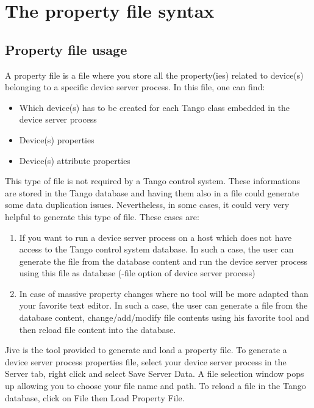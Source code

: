 
\chapter{The property file syntax}


\section{Property file usage}

A property file is a file where you store all the property(ies) related
to device(s) belonging to a specific device server process. In this
file, one can find:
\begin{itemize}
\item Which device(s) has to be created for each Tango class embedded in
the device server process
\item Device(s) properties
\item Device(s) attribute properties
\end{itemize}
This type of file is not required by a Tango control system. These
informations are stored in the Tango database and having them also
in a file could generate some data duplication issues. Nevertheless,
in some cases, it could very very helpful to generate this type of
file. These cases are:
\begin{enumerate}
\item If you want to run a device server process on a host which does not
have access to the Tango control system database. In such a case,
the user can generate the file from the database content and run the
device server process using this file as database (-file option of
device server process)
\item In case of massive property changes where no tool will be more adapted
than your favorite text editor. In such a case, the user can generate
a file from the database content, change/add/modify file contents
using his favorite tool and then reload file content into the database.
\end{enumerate}
Jive\cite{Jive doc} is the tool provided to generate and load a property
file. To generate a device server process properties file, select
your device server process in the \textquotedbl{}Server\textquotedbl{}
tab, right click and select \textquotedbl{}Save Server Data\textquotedbl{}.
A file selection window pops up allowing you to choose your file name
and path. To reload a file in the Tango database, click on \textquotedbl{}File\textquotedbl{}
then \textquotedbl{}Load Property File\textquotedbl{}. 


